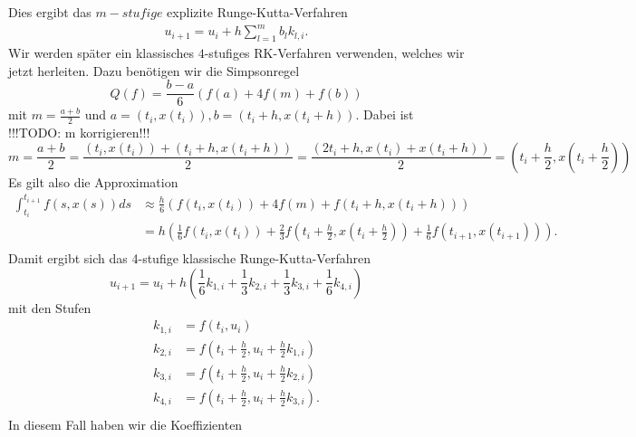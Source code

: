 Dies ergibt das $m-stufige$ explizite Runge-Kutta-Verfahren
\begin{align}
    u_{i+1} = u_i + h \sum_{l=1}^{m} b_l k_{l,i}.   \label{exp-rk-def}
\end{align}
Wir werden später ein klassisches $4$-stufiges RK-Verfahren verwenden, welches wir jetzt herleiten.
Dazu benötigen wir die Simpsonregel
\[
    Q(f) = \frac{b-a}{6} (f(a) + 4f(m) +f(b))
\]
mit $m = \frac{a+b}{2}$ und $a=(t_i,x(t_i)), b=(t_{i}+h,x(t_{i}+h))$. Dabei ist !!!TODO: m korrigieren!!!
\[
    m=\frac{a+b}{2}=\frac{(t_i,x(t_i)) + (t_{i}+h,x(t_{i}+h))}{2} = \frac{(2t_i + h, x(t_i) + x(t_i + h))}{2}
    = (t_i + \frac{h}{2}, x(t_i + \frac{h}{2}))
\]
Es gilt also die Approximation
\begin{align*}
    \int_{t_i}^{t_{i+1}} f(s,x(s)) ds &\approx \frac{h}{6}(f(t_i,x(t_i)) + 4f(m) + f(t_i + h,x(t_i + h))) \\
    &= h\left(\frac{1}{6}f(t_i,x(t_i)) + \frac{2}{3}f\left( t_i + \frac{h}{2}, x\left( t_i + \frac{h}{2}\right) \right)
    + \frac{1}{6}f(t_{i+1},x(t_{i+1}))\right). \\
\end{align*}
Damit ergibt sich das 4-stufige klassische Runge-Kutta-Verfahren
\[
    u_{i+1} = u_i + h\left( \frac{1}{6}k_{1,i} + \frac{1}{3} k_{2,i} + \frac{1}{3} k_{3,i} + \frac{1}{6} k_{4,i} \right)
\]
mit den Stufen
\begin{align*}
    k_{1,i} &= f(t_i,u_i) \\
    k_{2,i} &= f(t_i + \frac{h}{2}, u_i + \frac{h}{2}k_{1,i}) \\
    k_{3,i} &= f(t_i + \frac{h}{2}, u_i + \frac{h}{2}k_{2,i}) \\
    k_{4,i} &= f(t_i + \frac{h}{2}, u_i + \frac{h}{2}k_{3,i}). \\
\end{align*}
In diesem Fall haben wir die Koeffizienten
